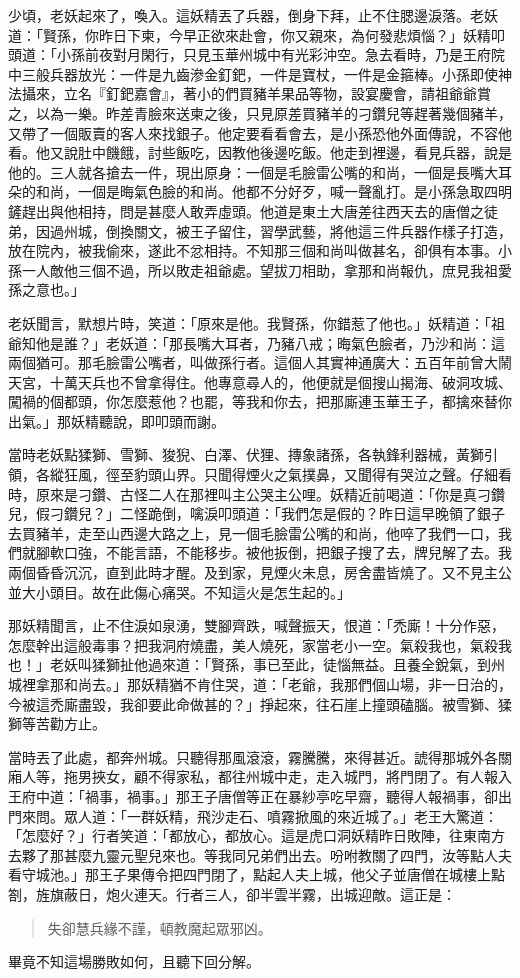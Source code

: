 少頃，老妖起來了，喚入。這妖精丟了兵器，倒身下拜，止不住腮邊淚落。老妖道：「賢孫，你昨日下柬，今早正欲來赴會，你又親來，為何發悲煩惱？」妖精叩頭道：「小孫前夜對月閑行，只見玉華州城中有光彩沖空。急去看時，乃是王府院中三般兵器放光：一件是九齒滲金釘鈀，一件是寶杖，一件是金箍棒。小孫即使神法攝來，立名『釘鈀嘉會』，著小的們買豬羊果品等物，設宴慶會，請祖爺爺賞之，以為一樂。昨差青臉來送柬之後，只見原差買豬羊的刁鑽兒等趕著幾個豬羊，又帶了一個販賣的客人來找銀子。他定要看看會去，是小孫恐他外面傳說，不容他看。他又說肚中饑餓，討些飯吃，因教他後邊吃飯。他走到裡邊，看見兵器，說是他的。三人就各搶去一件，現出原身：一個是毛臉雷公嘴的和尚，一個是長嘴大耳朵的和尚，一個是晦氣色臉的和尚。他都不分好歹，喊一聲亂打。是小孫急取四明鏟趕出與他相持，問是甚麼人敢弄虛頭。他道是東土大唐差往西天去的唐僧之徒弟，因過州城，倒換關文，被王子留住，習學武藝，將他這三件兵器作樣子打造，放在院內，被我偷來，遂此不忿相持。不知那三個和尚叫做甚名，卻俱有本事。小孫一人敵他三個不過，所以敗走祖爺處。望拔刀相助，拿那和尚報仇，庶見我祖愛孫之意也。」

老妖聞言，默想片時，笑道：「原來是他。我賢孫，你錯惹了他也。」妖精道：「祖爺知他是誰？」老妖道：「那長嘴大耳者，乃豬八戒；晦氣色臉者，乃沙和尚：這兩個猶可。那毛臉雷公嘴者，叫做孫行者。這個人其實神通廣大：五百年前曾大鬧天宮，十萬天兵也不曾拿得住。他專意尋人的，他便就是個搜山揭海、破洞攻城、闖禍的個都頭，你怎麼惹他？也罷，等我和你去，把那廝連玉華王子，都擒來替你出氣。」那妖精聽說，即叩頭而謝。

當時老妖點猱獅、雪獅、狻猊、白澤、伏狸、摶象諸孫，各執鋒利器械，黃獅引領，各縱狂風，徑至豹頭山界。只聞得煙火之氣撲鼻，又聞得有哭泣之聲。仔細看時，原來是刁鑽、古怪二人在那裡叫主公哭主公哩。妖精近前喝道：「你是真刁鑽兒，假刁鑽兒？」二怪跪倒，噙淚叩頭道：「我們怎是假的？昨日這早晚領了銀子去買豬羊，走至山西邊大路之上，見一個毛臉雷公嘴的和尚，他啐了我們一口，我們就腳軟口強，不能言語，不能移步。被他扳倒，把銀子搜了去，牌兒解了去。我兩個昏昏沉沉，直到此時才醒。及到家，見煙火未息，房舍盡皆燒了。又不見主公並大小頭目。故在此傷心痛哭。不知這火是怎生起的。」

那妖精聞言，止不住淚如泉湧，雙腳齊跌，喊聲振天，恨道：「禿廝！十分作惡，怎麼幹出這般毒事？把我洞府燒盡，美人燒死，家當老小一空。氣殺我也，氣殺我也！」老妖叫猱獅扯他過來道：「賢孫，事已至此，徒惱無益。且養全銳氣，到州城裡拿那和尚去。」那妖精猶不肯住哭，道：「老爺，我那們個山場，非一日治的，今被這禿廝盡毀，我卻要此命做甚的？」掙起來，往石崖上撞頭磕腦。被雪獅、猱獅等苦勸方止。

當時丟了此處，都奔州城。只聽得那風滾滾，霧騰騰，來得甚近。諕得那城外各關廂人等，拖男挾女，顧不得家私，都往州城中走，走入城門，將門閉了。有人報入王府中道：「禍事，禍事。」那王子唐僧等正在暴紗亭吃早齋，聽得人報禍事，卻出門來問。眾人道：「一群妖精，飛沙走石、噴霧掀風的來近城了。」老王大驚道：「怎麼好？」行者笑道：「都放心，都放心。這是虎口洞妖精昨日敗陣，往東南方去夥了那甚麼九靈元聖兒來也。等我同兄弟們出去。吩咐教關了四門，汝等點人夫看守城池。」那王子果傳令把四門閉了，點起人夫上城，他父子並唐僧在城樓上點劄，旌旗蔽日，炮火連天。行者三人，卻半雲半霧，出城迎敵。這正是：
\begin{quote}
失卻慧兵緣不謹，頓教魔起眾邪凶。
\end{quote}

畢竟不知這場勝敗如何，且聽下回分解。
